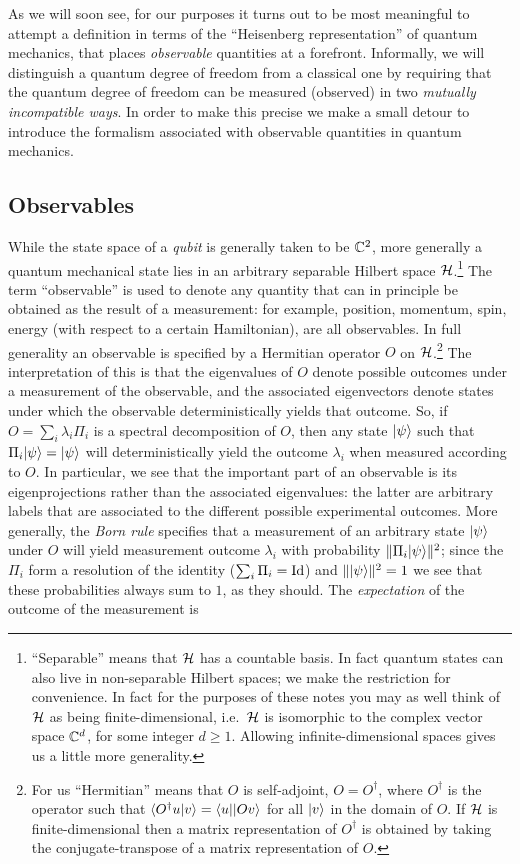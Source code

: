 As we will soon see, for our purposes it turns out to be most meaningful to attempt a definition in terms of the ``Heisenberg representation'' of quantum mechanics, that places \emph{observable} quantities at a forefront. Informally, we will distinguish a quantum degree of freedom from a classical one by requiring that the quantum degree of freedom can be measured (observed) in two \emph{mutually incompatible ways}.  In order to make this precise we make a small detour to introduce the formalism associated with observable quantities in quantum mechanics. 

\subsection{Observables}

While the state space of a \emph{qubit} is generally taken to be $\mathbb{C}^2$, more generally a quantum mechanical state lies in an arbitrary separable Hilbert space $\mathcal{H}$.\footnote{``Separable''  means that $\mathcal{H}$ has a countable basis. In fact quantum states can also live in non-separable Hilbert spaces; we make the restriction for convenience. In fact for the purposes of these notes you may as well think of $\mathcal{H}$ as being finite-dimensional, i.e.\ $\mathcal{H}$ is isomorphic to the complex vector space $\mathbb{C}^d$, for some integer $d\geq 1$. Allowing infinite-dimensional spaces gives us a little more generality.} 
The term ``observable'' is used to denote any quantity that can in principle be obtained as the result of a measurement: for example, position, momentum, spin, energy (with respect to a certain Hamiltonian), are all observables. In full generality an observable is specified by 
 a Hermitian operator $O$ on $\mathcal{H}$.\footnote{For us ``Hermitian'' means that $O$ is self-adjoint, $O=O^\dagger$, where $O^\dagger$ is the operator such that $\langle O^\dagger u|v\rangle = \langle u||Ov\rangle$ for all $|v\rangle$ in the domain of $O$. If $\mathcal{H}$ is finite-dimensional then a matrix representation of $O^\dagger$ is obtained by taking the conjugate-transpose of a matrix representation of $O$.}
 The interpretation of this is that the eigenvalues of $O$ denote possible outcomes under a measurement of the observable, and  the associated eigenvectors denote states under which the observable deterministically yields that outcome. So, if $O = \sum_i \lambda_i \Pi_i$ is a spectral decomposition of $O$, then any state $|\psi\rangle$ such that $\Pi_i |\psi\rangle = |\psi\rangle$ will deterministically yield the outcome $\lambda_i$ when measured according to $O$. In particular, we see that the important part of an observable is its eigenprojections rather than the associated eigenvalues: the latter are arbitrary labels that are associated to the different possible experimental outcomes. More generally, the \emph{Born rule} specifies that a measurement of an arbitrary state $|\psi\rangle$ under $O$ will yield measurement outcome $\lambda_i$ with probability $\|\Pi_i |\psi\rangle\|^2$; since the $\Pi_i$ form a resolution of the identity ($\sum_i \Pi_i=\mathop{\rm Id}\nolimits$) and $\||\psi\rangle\|^2=1$ we see that these probabilities always sum to $1$, as they should. The \emph{expectation} of the outcome of the measurement is 
